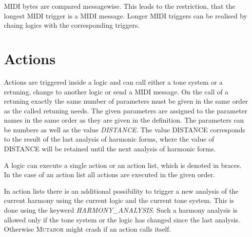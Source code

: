 MIDI bytes are compared messagewise. This leads to the restriction,
that the longest MIDI trigger is a MIDI message. Longer MIDI triggers
can be realised by chaing logics with the corresponding triggers.

    

\section{Actions}\label{sec:aktionen}

Actions are triggered inside a logic and can call either a
tone system or a retuning, change to another logic or send a MIDI
message. On the call of a retuning exactly the same number of
parameters must be given in the same order as the
called retuning needs. The given parameters are assigned to the
parameter names in the same order as they are given in the
definition. The parameters can be numbers as well as the value
\textit{DISTANCE}. The value DISTANCE corresponds to
the result of the last analysis of harmonic forms, where the value of
DISTANCE will be retained until the next analysis of harmonic forms.

\iffalse
Aktionen werden innerhalb einer Logik ausgelöst und können wahlweise
ein Tonsystem aufrufen, eine Umstimmung aufrufen,
zu einer Logik wechseln oder eine MIDI-Nachricht
senden. Beim Aufruf einer Umstimmung müssen genau so viele Parameter\index{Parameter}
mitgegeben werden, wie die aufgerufene Umstimmung benötigt. Die mitgegebenen
Parameter werden in der gleichen Reihenfolge den Parameter-Namen
der Umstimmung zugeordnet. Als Parameter können Zahlen angegeben werden,
sowie der Wert {\it ABSTAND}\index{ABSTAND}.
Der Wert ABSTAND entspricht den Gegebenheiten der
zuletzt durchgeführten Harmonie-FORM-Analyse, wobei der Wert
ABSTAND bis zur nächsten Harmonie-FORM-Analyse beibehalten wird.
\fi

A logic can execute a single action or an action list, which is
denoted in braces. In the case of an action list all actions are
executed in the given order.

\iffalse
Eine Logik kann eine einzelne Aktion ausführen oder eine in geschweiften
Klammern stehende Aktions-Liste aus\-füh\-ren. Im Falle der Aktions-Liste
werden die einzelnen Aktionen der Liste in genau der angegebenen
Reihenfolge ausgeführt.
\fi

In action lists there is an additional possibility to trigger a new
analysis of the current harmony using the current logic and the
current tone system. This is done using the keywerd
\emph{HARMONY_ANALYSIS}. Such a harmony
analysis is allowed only if the tone system or the logic has changed
since the last analysis. Otherwise \textsc{Mutabor} might crash if an
action calls itself.

